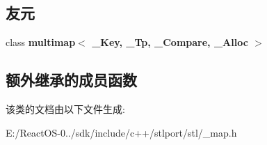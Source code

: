 \subsection*{友元}
\begin{DoxyCompactItemize}
\item 
\mbox{\label{classmultimap_1_1value__compare_aae94808df44163ad202e98501ab72782}} 
class {\bfseries multimap$<$ \+\_\+\+Key, \+\_\+\+Tp, \+\_\+\+Compare, \+\_\+\+Alloc $>$}
\end{DoxyCompactItemize}
\subsection*{额外继承的成员函数}


该类的文档由以下文件生成\+:\begin{DoxyCompactItemize}
\item 
E\+:/\+React\+O\+S-\/0../sdk/include/c++/stlport/stl/\+\_\+map.\+h\end{DoxyCompactItemize}
